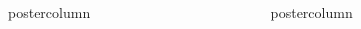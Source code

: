 \documentclass[xcolor=dvipsnames]{beamer}
\newlength{\columnheight}
\begin{document}
\begin{frame}
\begin{columns}
\begin{column}{.49\textwidth}
\begin{beamercolorbox}[center,wd=\textwidth]{postercolumn}
\end{beamercolorbox}
\end{column}
\begin{column}{.49\textwidth}
\begin{beamercolorbox}[center,wd=\textwidth]{postercolumn}
\begin{minipage}[T]{0.95\textwidth} %
\parbox[t][\columnheight]{\textwidth}{ %
}
\end{minipage}
\end{beamercolorbox}
\end{column}
\end{columns}
\end{frame}
\end{document}
